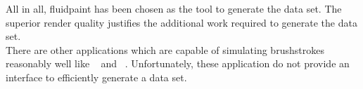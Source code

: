 All in all, fluidpaint has been chosen as the tool to generate the data set.
The superior render quality justifies the additional work required to generate the data set.\\
There are other applications which are capable of simulating brushstrokes reasonably well like ~\cite{artrage} and ~\cite{krita}.
Unfortunately, these application do not provide an interface to efficiently generate a data set.
\begin{marginfigure}
    \qquad
\end{marginfigure}

